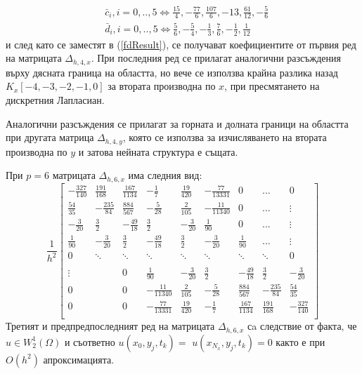 \documentclass[a4paper]{article}
\newcommand{\rf}[1]{(\ref{#1})}
\theoremstyle{remark}
\begin{document}
\begin{large}
\begin{align}
&\bar c_i, i = 0,..,5 \iff \frac{15}{4}, -\frac{77}{6}, \frac{107}{6}, -13, \frac{61}{12}, -\frac{5}{6} \\
&\bar d_i, i = 0,..,5 \iff \frac{5}{6}, -\frac{5}{4}, -\frac{1}{3}, \frac{7}{6}, -\frac{1}{2}, \frac{1}{12} 
\end{align}
и след като се заместят в \rf{fdResult}, се получават коефициентите от първия ред на матрицата $\Delta_{h,4,x}$. При последния ред се прилагат аналогични разсъждения върху дясната граница на областта, но вече се използва крайна разлика назад $K_x[-4,-3,-2,-1,0]$ за втората производна по $x$, при пресмятането на дискретния Лапласиан. 

Аналогични разсъждения се прилагат за горната и долната граници на областта при другата матрица $\Delta_{h,4,y}$, която се използва за изчисляването на втората производна по $y$ и затова нейната структура е същата.

При $p=6$ матрицата $\Delta_{h,6,x}$ има следния вид:
\[
\frac{1}{h^2}
\begin{bmatrix}
   -\frac{327}{140}	& \frac{191}{168}	&   \frac{167}{1134}	& -\frac{1}{7}    		 & \frac{19}{420}	& -\frac{77}{13331}   &    0      	   	&   \dots           & 0    \\
    \frac{54}{35}    	&-\frac{235}{84}   	&    \frac{884}{567}    &-\frac{5}{28}  	 	& \frac{2}{105}		&  -\frac{11}{11340}	 &   0      	   	&   \dots	       & \vdots  \\
    -\frac{3}{20}		& \frac{3}{2}         	& -\frac{49}{18} 	&  \frac{3}{2}		&  -\frac{3}{20}    	 &   \frac{1}{90}    	 &  0			&     \dots         &\vdots    \\
    \frac{1}{90}		& -\frac{3}{20}		& \frac{3}{2}         	& -\frac{49}{18} 	&  \frac{3}{2}		&  -\frac{3}{20}    	 &   \frac{1}{90} &     \dots         &\vdots    \\
        0           		& \ddots        		&         \ddots           	& \ddots        		&    \ddots   		&   \ddots      		 &     \ddots    	&  \ddots          &    0 \\	
\\
   \vdots      		&            		 	&    	0	      		& \frac{1}{90}		& -\frac{3}{20}		& \frac{3}{2}         	& -\frac{49}{18}	&  \frac{3}{2}  &  -\frac{3}{20} \\
    0      			&              	 	&    0      		&   -\frac{11}{11340}	 	&    \frac{2}{105} 	&  -\frac{5}{28} 	& \frac{884}{567} &-\frac{235}{84} &  \frac{54}{35}\\
    0              	& 	          		&    0              	&  -\frac{77}{13331}    		&  \frac{19}{420}&-\frac{1}{7}	 &  \frac{167}{1134} 	& \frac{191}{168}  &  -\frac{327}{140}\\
\end{bmatrix}
\]
Третият и предпредпоследният ред на матрицата $\Delta_{h,6,x}$ сa следствие от факта, че $u \in W^1_2(\Omega)$ и съответно $u(x_0, y_j, t_k) =$ $u(x_{N_x}, y_j, t_k) = 0$ както е при $O(h^2)$ апроксимацията. 


\end{large}
\end{document}
